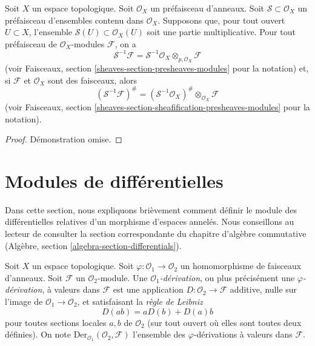 \begin{lemma}
\label{lemma-simple-invert-module}
Soit $X$ un espace topologique.
Soit $\mathcal{O}_X$ un préfaisceau d'anneaux.
Soit $\mathcal{S} \subset \mathcal{O}_X$ un préfaisceau d'ensembles contenu
dans $\mathcal{O}_X$. Supposons que, pour tout ouvert $U \subset X$,
l'ensemble $\mathcal{S}(U) \subset \mathcal{O}_X(U)$ soit une partie
multiplicative. Pour tout préfaisceau de $\mathcal{O}_X$-modules
$\mathcal{F}$, on a
$$
\mathcal{S}^{-1}\mathcal{F}
=
\mathcal{S}^{-1}\mathcal{O}_X \otimes_{p, \mathcal{O}_X} \mathcal{F}
$$
(voir Faisceaux, section \ref{sheaves-section-presheaves-modules} pour la
notation) et, si $\mathcal{F}$ et $\mathcal{O}_X$ sont des faisceaux, alors
$$
(\mathcal{S}^{-1}\mathcal{F})^\#
=
(\mathcal{S}^{-1}\mathcal{O}_X)^\# \otimes_{\mathcal{O}_X} \mathcal{F}
$$
(voir Faisceaux, section
\ref{sheaves-section-sheafification-presheaves-modules} pour la notation).
\end{lemma}

\begin{proof}
Démonstration omise.
\end{proof}








\section{Modules de différentielles}
\label{section-differentials}

\noindent
Dans cette section, nous expliquons brièvement comment définir le module des
différentielles relatives d'un morphisme d'espaces annelés. Nous conseillons
au lecteur de consulter la section correspondante du chapitre d'algèbre
commutative (Algèbre, section \ref{algebra-section-differentials}).

\begin{definition}
\label{definition-derivation}
Soit $X$ un espace topologique. Soit
$\varphi : \mathcal{O}_1 \to \mathcal{O}_2$ un homomorphisme de faisceaux
d'anneaux. Soit $\mathcal{F}$ un $\mathcal{O}_2$-module. Une
{\it $\mathcal{O}_1$-dérivation}, ou plus précisément une
{\it $\varphi$-dérivation}, à valeurs dans $\mathcal{F}$ est une application
$D : \mathcal{O}_2 \to \mathcal{F}$ additive, nulle sur l'image de
$\mathcal{O}_1 \to \mathcal{O}_2$, et satisfaisant la
{\it règle de Leibniz}
$$
D(ab) = aD(b) + D(a)b
$$
pour toutes sections locales $a, b$ de $\mathcal{O}_2$ (sur tout ouvert où
elles sont toutes deux définies). On note
$\text{Der}_{\mathcal{O}_1}(\mathcal{O}_2, \mathcal{F})$ l'ensemble des
$\varphi$-dérivations à valeurs dans $\mathcal{F}$.
\end{definition}

